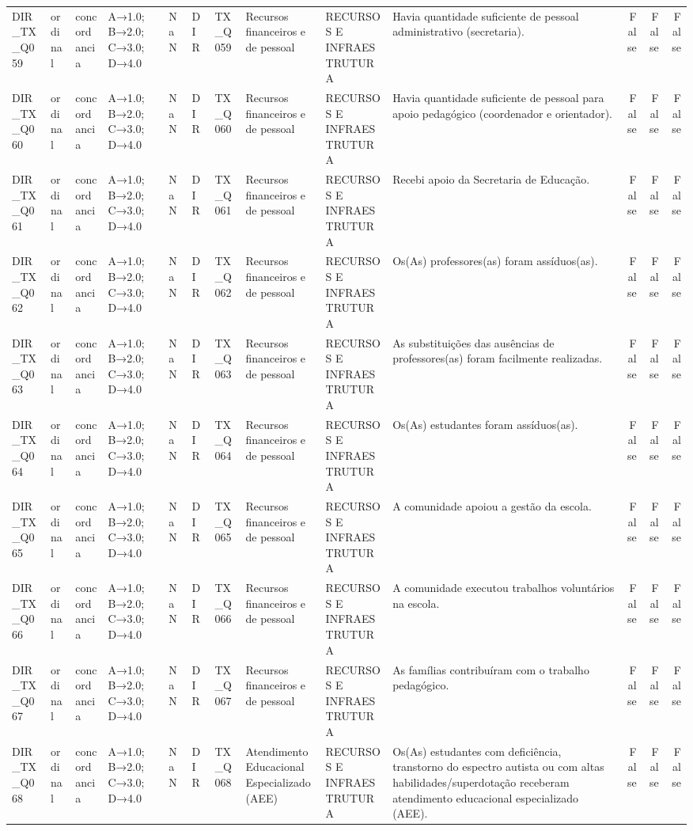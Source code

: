 \begin{tabular}{llllllllllrrr}
DIR\_TX\_Q059 & ordinal & concordancia & A→1.0; B→2.0; C→3.0; D→4.0 & NaN & DIR & TX\_Q059 & Recursos financeiros e de pessoal & RECURSOS E INFRAESTRUTURA & Havia quantidade suficiente de pessoal administrativo (secretaria). & False & False & False \\
DIR\_TX\_Q060 & ordinal & concordancia & A→1.0; B→2.0; C→3.0; D→4.0 & NaN & DIR & TX\_Q060 & Recursos financeiros e de pessoal & RECURSOS E INFRAESTRUTURA & Havia quantidade suficiente de pessoal para apoio pedagógico (coordenador e orientador). & False & False & False \\
DIR\_TX\_Q061 & ordinal & concordancia & A→1.0; B→2.0; C→3.0; D→4.0 & NaN & DIR & TX\_Q061 & Recursos financeiros e de pessoal & RECURSOS E INFRAESTRUTURA & Recebi apoio da Secretaria de Educação. & False & False & False \\
DIR\_TX\_Q062 & ordinal & concordancia & A→1.0; B→2.0; C→3.0; D→4.0 & NaN & DIR & TX\_Q062 & Recursos financeiros e de pessoal & RECURSOS E INFRAESTRUTURA & Os(As) professores(as) foram assíduos(as). & False & False & False \\
DIR\_TX\_Q063 & ordinal & concordancia & A→1.0; B→2.0; C→3.0; D→4.0 & NaN & DIR & TX\_Q063 & Recursos financeiros e de pessoal & RECURSOS E INFRAESTRUTURA & As substituições das ausências de professores(as) foram facilmente realizadas. & False & False & False \\
DIR\_TX\_Q064 & ordinal & concordancia & A→1.0; B→2.0; C→3.0; D→4.0 & NaN & DIR & TX\_Q064 & Recursos financeiros e de pessoal & RECURSOS E INFRAESTRUTURA & Os(As) estudantes foram assíduos(as). & False & False & False \\
DIR\_TX\_Q065 & ordinal & concordancia & A→1.0; B→2.0; C→3.0; D→4.0 & NaN & DIR & TX\_Q065 & Recursos financeiros e de pessoal & RECURSOS E INFRAESTRUTURA & A comunidade apoiou a gestão da escola. & False & False & False \\
DIR\_TX\_Q066 & ordinal & concordancia & A→1.0; B→2.0; C→3.0; D→4.0 & NaN & DIR & TX\_Q066 & Recursos financeiros e de pessoal & RECURSOS E INFRAESTRUTURA & A comunidade executou trabalhos voluntários na escola. & False & False & False \\
DIR\_TX\_Q067 & ordinal & concordancia & A→1.0; B→2.0; C→3.0; D→4.0 & NaN & DIR & TX\_Q067 & Recursos financeiros e de pessoal & RECURSOS E INFRAESTRUTURA & As famílias contribuíram com o trabalho pedagógico. & False & False & False \\
DIR\_TX\_Q068 & ordinal & concordancia & A→1.0; B→2.0; C→3.0; D→4.0 & NaN & DIR & TX\_Q068 & Atendimento Educacional Especializado (AEE) & RECURSOS E INFRAESTRUTURA & Os(As) estudantes com deficiência, transtorno do espectro autista ou com altas habilidades/superdotação receberam atendimento educacional especializado (AEE). & False & False & False \\

\end{tabular}
